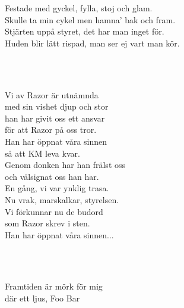 \songtext{}Festade med gyckel, fylla, stoj och glam.\\
Skulle ta min cykel men hamna' bak och fram.\\
Stjärten uppå styret, det har man inget för.\\
Huden blir lätt rispad, man ser ej vart man kör.

 \\


 \\       
\author{Text: Martin Johnsson}

\songtext{}Vi av Razor är utnämnda \\
med sin vishet djup och stor \\
han har givit oss ett ansvar \\
för att Razor på oss tror. \\
Han har öppnat våra sinnen \\
så att KM leva kvar. \\
Genom donken har han frälst oss \\
och välsignat oss han har. \\
En gång, vi var ynklig trasa. \\
Nu vrak, marskalkar, styrelsen. \\
Vi förkunnar nu de budord \\
som Razor skrev i sten. \\
Han har öppnat våra sinnen...

\newpage 


 \\       
\author{Text: Sebastian Stureborg}

 \\
Framtiden är mörk för mig \\
där ett ljus, Foo Bar

 \\



 \\       
\author{Text: Martin Johnsson}

